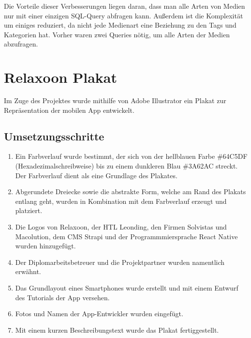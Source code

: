 Die Vorteile dieser Verbesserungen liegen daran, dass man alle Arten von Medien nur mit einer einzigen SQL-Query abfragen kann. Außerdem ist die Komplexität um einiges reduziert, da nicht jede Medienart eine Beziehung zu den Tags und Kategorien hat.
Vorher waren zwei Queries nötig, um alle Arten der Medien abzufragen.

\section{Relaxoon Plakat}\label{sec:plakat}

Im Zuge des Projektes wurde mithilfe von Adobe Illustrator ein Plakat zur Repräsentation der mobilen App
entwickelt.
\subsection{Umsetzungsschritte}

\begin{enumerate}
    \item Ein Farbverlauf wurde bestimmt, der sich von der hellblauen Farbe \#64C5DF (Hexadezimalschreibweise)
          bis zu einem dunkleren Blau \#3A62AC streckt. Der Farbverlauf dient als eine Grundlage des Plakates.
    \item Abgerundete Dreiecke sowie die abstrakte Form, welche am Rand des Plakats entlang geht,
          wurden in Kombination mit dem Farbverlauf erzeugt und platziert.
    \item Die Logos von Relaxoon, der HTL Leonding, den Firmen Solvistas und Macolution, dem CMS Strapi und der Programmmiersprache React Native wurden hinzugefügt.
    \item Der Diplomarbeitsbetreuer und die Projektpartner wurden namentlich erwähnt.
    \item Das Grundlayout eines Smartphones wurde erstellt und mit einem Entwurf des Tutorials der App versehen.
    \item Fotos und Namen der App-Entwickler wurden eingefügt.
    \item Mit einem kurzen Beschreibungstext wurde das Plakat fertiggestellt.
\end{enumerate}


